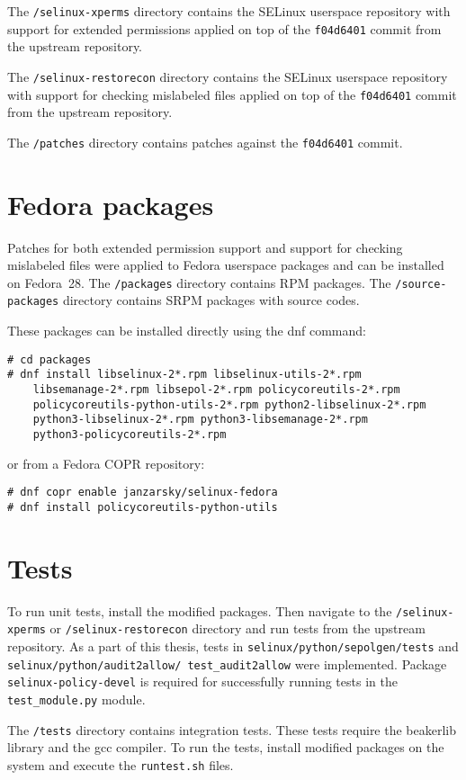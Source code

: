The \texttt{/selinux-xperms} directory contains the SELinux userspace repository
with support for extended permissions applied on top of the \texttt{f04d6401}
commit from the upstream repository.

The \texttt{/selinux-restorecon} directory contains the SELinux userspace
repository with support for checking mislabeled files applied on top of the
\texttt{f04d6401} commit from the upstream repository.

The \texttt{/patches} directory contains patches against the \texttt{f04d6401}
commit.

\section{Fedora packages}

Patches for both extended permission support and support for checking mislabeled
files were applied to Fedora userspace packages and can be installed on
Fedora~28. The \texttt{/packages} directory contains RPM packages. The
\texttt{/source-packages} directory contains SRPM packages with source codes.

These packages can be installed directly using the dnf command:
\begin{lstlisting}
# cd packages
# dnf install libselinux-2*.rpm libselinux-utils-2*.rpm
    libsemanage-2*.rpm libsepol-2*.rpm policycoreutils-2*.rpm
    policycoreutils-python-utils-2*.rpm python2-libselinux-2*.rpm
    python3-libselinux-2*.rpm python3-libsemanage-2*.rpm
    python3-policycoreutils-2*.rpm
\end{lstlisting}
or from a Fedora COPR repository:
\begin{lstlisting}
# dnf copr enable janzarsky/selinux-fedora
# dnf install policycoreutils-python-utils
\end{lstlisting}

\section{Tests}
To run unit tests, install the modified packages. Then navigate to the
\texttt{/selinux-xperms} or \texttt{/selinux-restorecon} directory and run tests
from the upstream repository. As a part of this thesis, tests in
\texttt{selinux/\allowbreak python/\allowbreak sepolgen/\allowbreak tests} and 
\texttt{selinux/\allowbreak python/\allowbreak audit2al\-low/\allowbreak
test\_audit2allow} were implemented. Package \texttt{selinux-policy-devel} is
required for successfully running tests in the \texttt{test\_module.py} module.

The \texttt{/tests} directory contains integration tests. These tests require
the beakerlib library and the gcc compiler. To run the tests, install modified
packages on the system and execute the \texttt{runtest.sh} files.

